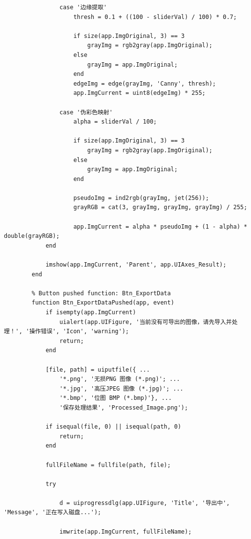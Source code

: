 \documentclass[UTF8, a4paper, 11pt]{ctexart}
\begin{document}
\begin{lstlisting}
                case '边缘提取'
                    thresh = 0.1 + ((100 - sliderVal) / 100) * 0.7; 
                    
                    if size(app.ImgOriginal, 3) == 3
                        grayImg = rgb2gray(app.ImgOriginal);
                    else
                        grayImg = app.ImgOriginal;
                    end
                    edgeImg = edge(grayImg, 'Canny', thresh);
                    app.ImgCurrent = uint8(edgeImg) * 255;
                    
                case '伪彩色映射'
                    alpha = sliderVal / 100; 
                    
                    if size(app.ImgOriginal, 3) == 3
                        grayImg = rgb2gray(app.ImgOriginal);
                    else
                        grayImg = app.ImgOriginal;
                    end
                    
                    pseudoImg = ind2rgb(grayImg, jet(256));
                    grayRGB = cat(3, grayImg, grayImg, grayImg) / 255;
                    
                    app.ImgCurrent = alpha * pseudoImg + (1 - alpha) * double(grayRGB);
            end
            
            imshow(app.ImgCurrent, 'Parent', app.UIAxes_Result);
        end

        % Button pushed function: Btn_ExportData
        function Btn_ExportDataPushed(app, event)
            if isempty(app.ImgCurrent)
                uialert(app.UIFigure, '当前没有可导出的图像，请先导入并处理！', '操作错误', 'Icon', 'warning');
                return;
            end
            
            [file, path] = uiputfile({ ...
                '*.png', '无损PNG 图像 (*.png)'; ...
                '*.jpg', '高压JPEG 图像 (*.jpg)'; ...
                '*.bmp', '位图 BMP (*.bmp)'}, ...
                '保存处理结果', 'Processed_Image.png');
            
            if isequal(file, 0) || isequal(path, 0)
                return;
            end
            
            fullFileName = fullfile(path, file);
            
            try
             
                d = uiprogressdlg(app.UIFigure, 'Title', '导出中', 'Message', '正在写入磁盘...');
                
                imwrite(app.ImgCurrent, fullFileName);
                

\end{lstlisting}
\end{document}
